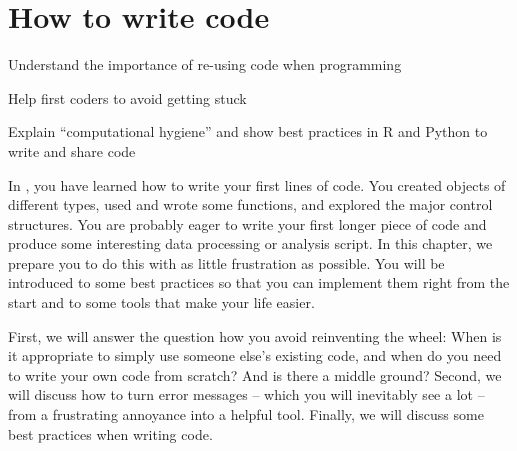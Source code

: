 \chapter{How to write code}
\label{chap:worldcode}

\begin{abstract}{Abstract}  
Programming is no longer a solitary activity, and almost all questions, problems, and error messages have been encountered and solved before. This chapter explains the most common forms of collaboration and sources of outside help, as well as giving best practices on how to write and share code yourself.
\end{abstract}


\begin{objectives}
\item Understand the importance of re-using code when programming
\item Help first coders to avoid getting stuck
\item Explain ``computational hygiene'' and show best practices in R and Python to write and share code
\end{objectives}

In , you have learned how to write
your first lines of code.  You created objects of different types,
used and wrote some functions, and explored the major control structures.
You are probably eager to write your first longer piece of code and
produce some interesting data processing or analysis script. In this
chapter, we prepare you to do this with as little frustration as possible.
You will be introduced to some best practices so that you can implement
them right from the start and to some tools that make your life easier.

First, we will answer the question how you avoid reinventing
the wheel: When is it appropriate to simply use someone else's existing code, and
when do you need to write your own code from scratch? And is there a middle ground?
Second, we will discuss how to turn error messages -- which you will inevitably
see a lot -- from a frustrating annoyance into a helpful tool.
Finally, we will discuss some best practices when writing code.






